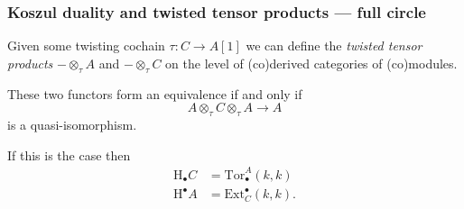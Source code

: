 \documentclass{beamer}
\begin{document}
        \begin{frame}\frametitle{Koszul duality and twisted tensor products --- full circle}
            Given some twisting cochain $\tau\colon C\to A[1]$ we can define the \emph{twisted tensor products} $-\otimes_\tau A$ and $-\otimes_\tau C$ on the level of (co)derived categories of (co)modules.

            \pause

            These two functors form an equivalence if and only if
            \begin{equation*}
                A\otimes_\tau C\otimes_\tau A\to A
            \end{equation*}
            is a quasi-isomorphism.

            If this is the case then
            \begin{align*}
                \mathrm{H}_\bullet C &= \mathrm{Tor}_\bullet^A(k,k)\\
                \mathrm{H}^\bullet A &= \mathrm{Ext}_C^\bullet(k,k).
            \end{align*}
        \end{frame}
\end{document}
